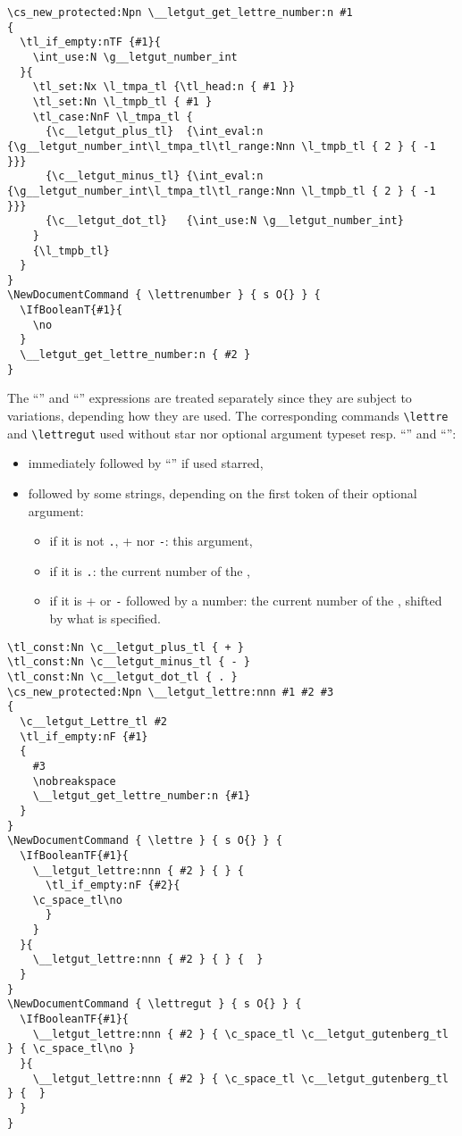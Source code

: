 \documentclass{letgut}
\begin{document}
\begin{lstlisting}
\cs_new_protected:Npn \__letgut_get_lettre_number:n #1
{
  \tl_if_empty:nTF {#1}{
    \int_use:N \g__letgut_number_int
  }{
    \tl_set:Nx \l_tmpa_tl {\tl_head:n { #1 }}
    \tl_set:Nn \l_tmpb_tl { #1 }
    \tl_case:NnF \l_tmpa_tl {
      {\c__letgut_plus_tl}  {\int_eval:n {\g__letgut_number_int\l_tmpa_tl\tl_range:Nnn \l_tmpb_tl { 2 } { -1 }}}
      {\c__letgut_minus_tl} {\int_eval:n {\g__letgut_number_int\l_tmpa_tl\tl_range:Nnn \l_tmpb_tl { 2 } { -1 }}}
      {\c__letgut_dot_tl}   {\int_use:N \g__letgut_number_int}
    }
    {\l_tmpb_tl}
  }
}
\NewDocumentCommand { \lettrenumber } { s O{} } {
  \IfBooleanT{#1}{
    \no
  }
  \__letgut_get_lettre_number:n { #2 }
}
\end{lstlisting}

The “” and “” expressions are treated separately since they are
subject to variations, depending how they are used. The corresponding commands
\lstinline+\lettre+ and \lstinline+\lettregut+ used without star nor optional argument typeset
resp. “” and “”:

\begin{itemize}
\item immediately followed by “\no” if used starred,
\item followed by some strings, depending on the first token of their optional
argument:
\begin{itemize}
\item if it is not \lstinline+.+, \lstinline+++ nor \lstinline+-+: this argument,
\item if it is \lstinline+.+: the current number of the ,
\item if it is \lstinline+++ or \lstinline+-+ followed by a number: the current number of the ,
shifted by what is specified.
\end{itemize}
\end{itemize}

\begin{lstlisting}
\tl_const:Nn \c__letgut_plus_tl { + }
\tl_const:Nn \c__letgut_minus_tl { - }
\tl_const:Nn \c__letgut_dot_tl { . }
\cs_new_protected:Npn \__letgut_lettre:nnn #1 #2 #3
{
  \c__letgut_Lettre_tl #2
  \tl_if_empty:nF {#1}
  {
    #3
    \nobreakspace
    \__letgut_get_lettre_number:n {#1}
  }
}
\NewDocumentCommand { \lettre } { s O{} } {
  \IfBooleanTF{#1}{
    \__letgut_lettre:nnn { #2 } { } {
      \tl_if_empty:nF {#2}{
	\c_space_tl\no
      }
    }
  }{
    \__letgut_lettre:nnn { #2 } { } {  }
  }
}
\NewDocumentCommand { \lettregut } { s O{} } {
  \IfBooleanTF{#1}{
    \__letgut_lettre:nnn { #2 } { \c_space_tl \c__letgut_gutenberg_tl } { \c_space_tl\no }
  }{
    \__letgut_lettre:nnn { #2 } { \c_space_tl \c__letgut_gutenberg_tl } {  }
  }
}
\end{lstlisting}
\end{document}

